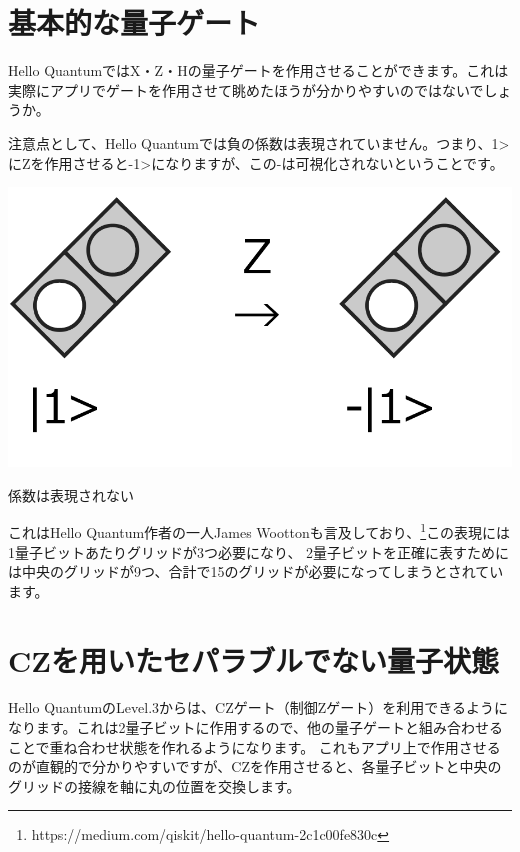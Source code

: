 \section*{基本的な量子ゲート}
\label{sec:1-4}

Hello QuantumではX・Z・Hの量子ゲートを作用させることができます。これは実際にアプリでゲートを作用させて眺めたほうが分かりやすいのではないでしょうか。

注意点として、Hello Quantumでは負の係数は表現されていません。つまり、\textbar{}1\textgreater{} にZを作用させると{-}\textbar{}1\textgreater{}になりますが、この{-}は可視化されないということです。

\begin{reviewimage}
\includegraphics[width=0.75\maxwidth]{./images/image5.png}
\caption{係数は表現されない}
\label{image:01:image5}
\end{reviewimage}

これはHello Quantum作者の一人James Woottonも言及しており、\footnote{https://medium.com/qiskit/hello{-}quantum{-}2c1c00fe830c}この表現には1量子ビットあたりグリッドが3つ必要になり、
2量子ビットを正確に表すためには中央のグリッドが9つ、合計で15のグリッドが必要になってしまうとされています。

\section*{CZを用いたセパラブルでない量子状態}
\label{sec:1-5}

Hello QuantumのLevel.3からは、CZゲート（制御Zゲート）を利用できるようになります。これは2量子ビットに作用するので、他の量子ゲートと組み合わせることで重ね合わせ状態を作れるようになります。
これもアプリ上で作用させるのが直観的で分かりやすいですが、CZを作用させると、各量子ビットと中央のグリッドの接線を軸に丸の位置を交換します。

